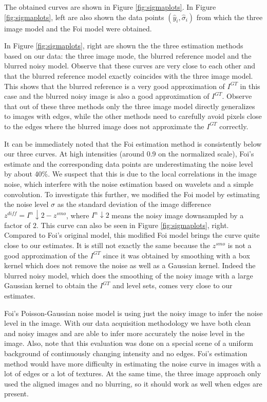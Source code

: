 \documentclass[review]{elsarticle}
\begin{document}
The obtained curves are shown in Figure \ref{fig:sigmaplots}. In Figure \ref{fig:sigmaplots}, left are also shown the data points $(\hat y_i,\hat \sigma_i)$ from which the three image model and the Foi model were obtained.


 In Figure \ref{fig:sigmaplots}, right are shown the the three estimation methods based on our data: the three image mode, the blurred reference model and the blurred noisy model. Observe that these curves are very close to each other and that the blurred reference model exactly coincides with the three image model. This shows that the blurred reference is a very good approximation of $I^{GT}$ in this case and the blurred noisy image is also a good approximation of $I^{GT}$. Observe that out of these three methods only the three image model directly generalizes to images with edges, while the other methods need to carefully avoid pixels close to the edges where the blurred image does not approximate the $I^{GT}$ correctly.
 
 It can be immediately noted that the Foi estimation method is consistently below our three curves. At high intensities (around 0.9 on the normalized scale), Foi's estimate and the corresponding data points are underestimating the noise level by about 40\%.  
We suspect that this is due to the local correlations in the image noise, which interfere with the noise estimation based on wavelets and a simple convolution. To investigate this further, we modified the Foi model by estimating the noise level $\sigma$ as the standard deviation of the image difference $z^{diff}=I^{n}\downarrow 2-z^{smo}$,  where $I^{n}\downarrow 2$ means the noisy image downsampled by a factor of $2$. This curve can also be seen in Figure \ref{fig:sigmaplots}, right. Compared to Foi's original model, this modified Foi model brings the curve quite close to our estimates. It is still not exactly the same because the $z^{smo}$ is not a good approximation of the $I^{GT}$ since it was obtained by smoothing with a box kernel which does not remove the noise as well as a Gaussian kernel. Indeed the blurred noisy model, which does the smoothing of the noisy image with a large Gaussian kernel to obtain the $I^{GT}$ and level sets, comes very close to our estimates.
  
Foi's Poisson-Gaussian noise model is using just the noisy image to infer the noise level in the image. With our data acquisition methodology we have both clean and noisy images and are able to infer more accurately the noise level in the image. Also, note that this evaluation was done on a special scene of a uniform background of continuously changing intensity and no edges. Foi's estimation method would have more difficulty in estimating the noise curve in images with a lot of edges or a lot of textures. At the same time, the three image approach only used the aligned images and no blurring, so it should work as well when edges are present.
\end{document}
